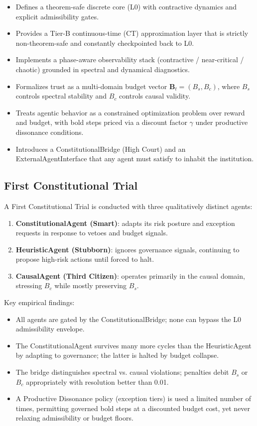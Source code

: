 \documentclass[11pt]{article}
\begin{document}
\begin{itemize}[itemsep=2pt]
  \item Defines a theorem-safe discrete core (L0) with contractive dynamics and explicit admissibility gates.
  \item Provides a Tier-B continuous-time (CT) approximation layer that is strictly non-theorem-safe and constantly checkpointed back to L0.
  \item Implements a phase-aware observability stack (contractive / near-critical / chaotic) grounded in spectral and dynamical diagnostics.
  \item Formalizes trust as a multi-domain budget vector \(\mathbf{B}_t = (B_s, B_c)\), where \(B_s\) controls spectral stability and \(B_c\) controls causal validity.
  \item Treats agentic behavior as a constrained optimization problem over reward and budget, with bold steps priced via a discount factor \(\gamma\) under productive dissonance conditions.
  \item Introduces a ConstitutionalBridge (High Court) and an ExternalAgentInterface that any agent must satisfy to inhabit the institution.
\end{itemize}

\subsection{First Constitutional Trial}

A First Constitutional Trial is conducted with three qualitatively distinct agents:

\begin{enumerate}[itemsep=2pt]
  \item \textbf{ConstitutionalAgent (Smart)}: adapts its risk posture and exception requests in response to vetoes and budget signals.
  \item \textbf{HeuristicAgent (Stubborn)}: ignores governance signals, continuing to propose high-risk actions until forced to halt.
  \item \textbf{CausalAgent (Third Citizen)}: operates primarily in the causal domain, stressing \(B_c\) while mostly preserving \(B_s\).
\end{enumerate}

Key empirical findings:

\begin{itemize}[itemsep=2pt]
  \item All agents are gated by the ConstitutionalBridge; none can bypass the L0 admissibility envelope.
  \item The ConstitutionalAgent survives many more cycles than the HeuristicAgent by adapting to governance; the latter is halted by budget collapse.
  \item The bridge distinguishes spectral vs. causal violations; penalties debit \(B_s\) or \(B_c\) appropriately with resolution better than 0.01.
  \item A Productive Dissonance policy (exception tiers) is used a limited number of times, permitting governed bold steps at a discounted budget cost, yet never relaxing admissibility or budget floors.
\end{itemize}
\end{document}
